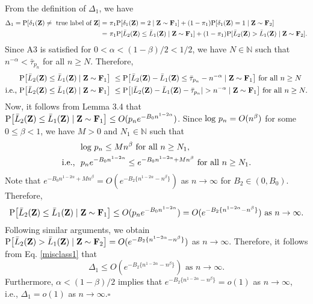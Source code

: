 \documentclass[twoside]{article}
\def\log{\hbox{log}}
\newcommand{\bZ}{\mathbf{Z}}
\newcommand{\bF}{\mathbf{F}}
\newcommand{\0}{\mathbf{0}}
\newcommand{\1}{\mathbf{1}}
\newcommand*{\QEDB}{\hfill\ensuremath{\square}}
\numberwithin{equation}{section}
\begin{document}

From the definition of $\Delta_1$, we have
\begin{align}\label{misclass1}
\Delta_1 = {\rm P}[\delta_1(\bZ)\neq \text{ true label of }\bZ]
 =&\ \pi_1 {\rm P}[\delta_1(\bZ)=2\mid \bZ\sim\bF_1] + (1-\pi_1){\rm P}[\delta_1(\bZ)=1\mid \bZ\sim\bF_2]\nonumber \\
 =&\ \pi_1 {\rm P}[\bar{L}_2(\bZ)\leq \bar{L}_1(\bZ)\mid \bZ\sim\bF_1]+ (1-\pi_1){\rm P}[\bar{L}_2(\bZ)> \bar{L}_1(\bZ)\mid \bZ\sim\bF_2].
\end{align}
Since A3 is satisfied for $0<\alpha<(1-\beta)/2<1/2$, we have $N\in \mathbb{N}$ such that $n^{-\alpha} <\bar{\tau}_{p_n}$ for all $n\geq N$. Therefore,
\begin{align}\label{ref15}
{\rm P}\big [\bar{L}_2(\bZ)\leq \bar{L}_1(\bZ)\mid \bZ\sim\bF_1\big ]
&\ \leq {\rm P}\big [\bar{L}_2(\bZ)- \bar{L}_1(\bZ)\leq \bar{\tau}_{p_n}-n^{-\alpha}\mid \bZ\sim\bF_1\big ]\text{ for all }n\geq N\nonumber \\
\text{i.e., }{\rm P}\big [\bar{L}_2(\bZ)\leq \bar{L}_1(\bZ)\mid \bZ\sim\bF_1\big ]&\ \leq {\rm P}\big [|\bar{L}_2(\bZ)- \bar{L}_1(\bZ) - \bar{\tau}_{p_n}|>n^{-\alpha}\mid \bZ\sim\bF_1\big ]\text{ for all }n\geq N.
\end{align}
Now, it follows from Lemma 3.4 that ${\rm P}\big [\bar{L}_2(\bZ)\leq \bar{L}_1(\bZ)\mid \bZ\sim\bF_1\big ]\leq O(p_ne^{-B_0n^{1-2\alpha}})$. Since $\log\ p_n =O(n^\beta)$ for some $0\leq \beta<1$, we have $M>0$ and $N_1\in\mathbb{N} $ such that
\begin{align*}
 &\ \log\ p_n\leq Mn^\beta \text{ for all } n\geq N_1,\\
 \text{i.e., }&\ p_n e^{-B_0n^{1-2\alpha}}\leq e^{-B_0n^{1-2\alpha} + M n^\beta}\text{ for all } n\geq N_1.
\end{align*}
Note that $e^{-B_0n^{1-2\alpha} + M n^\beta}=O(e^{-B_2\{n^{1-2\alpha} - n^\beta\}})$ as $n\to\infty$ for $B_2\in (0,B_0)$. Therefore,
$${\rm P}\big [\bar{L}_2(\bZ)\leq \bar{L}_1(\bZ)\mid \bZ\sim\bF_1\big ]\leq O(p_ne^{-B_0n^{1-2\alpha}})=O(e^{-B_2\{n^{1-2\alpha} - n^\beta\}})\text{ as }n\to\infty.$$
Following similar arguments, we obtain
${\rm P}\big [\bar{L}_2(\bZ)> \bar{L}_1(\bZ)\mid \bZ\sim\bF_2\big ]=O(e^{-B_2\{n^{1-2\alpha} - n^\beta\}})$ as $n\to\infty$. Therefore, it follows from Eq. \eqref{misclass1} that
$$\Delta_1 \leq  O(e^{-B_2\{n^{1-2\alpha} - n^\beta\}})\text{ as }n\to\infty.$$
Furthermore, $\alpha<(1-\beta)/2$ implies that $e^{-B_2\{n^{1-2\alpha} - n^\beta\}}=o(1)$ as $n\to\infty$, i.e., $\Delta_1=o(1)$ as $n\to\infty$.\hfill\QEDB\newline
\end{document}

